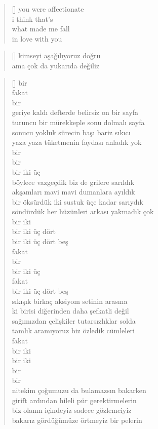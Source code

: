 \documentclass[a5paper, openright, twoside]{memoir}
\begin{document}
\begin{verse}[\versewidth]
  you were affectionate \\
  i think that's \\
  what made me fall \\
  in love with you \\
\end{verse}
\begin{verse}[\versewidth]
  kimseyi aşağılıyoruz doğru \\
  ama çok da yukarıda değiliz \\
\end{verse}
\begin{verse}[\versewidth]
  bir \\
  fakat \\
  bir \\
  geriye kaldı defterde belirsiz on bir sayfa \\
  turuncu bir mürekkeple sonu dolmalı sayfa \\
  sonucu yokluk sürecin başı bariz sıkıcı \\
  yaza yaza tüketmenin faydası anladık yok \\
  bir \\
  bir \\
  bir iki üç \\
  böylece vazgeçdik biz de grilere sarıldık \\
  akşamları mavi mavi dumanlara ayıldık \\
  bir öksürdük iki sustuk üçe kadar sarıydık \\
  söndürdük her hüzünleri arkası yakmadık çok \\
  bir iki \\
  bir iki üç dört \\
  bir iki üç dört beş \\
  fakat \\
  bir \\
  bir iki üç \\
  fakat \\
  bir iki üç dört beş \\
  sıkışık birkaç aksiyom setinin arasına \\
  ki birisi diğerinden daha şefkatli değil \\
  sağımızdan çelişkiler tutarsızlıklar solda \\
  tamlık aramıyoruz biz özledik cümleleri \\
  fakat \\
  bir iki \\
  bir iki \\
  bir \\
  bir \\
  nitekim çoğumuzu da bulamazsın bakarken \\
  girift ardından hileli pür gerektirmelerin \\
  biz olanın içindeyiz sadece gözlemciyiz \\
  bakarız gördüğümüze örtmeyiz bir pelerin \\
\end{verse}
\end{document}
